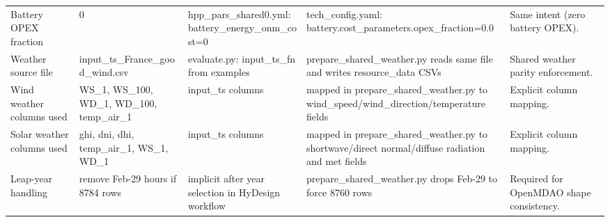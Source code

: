 \begin{center}
\begin{tabular}{L{0.16\textwidth} L{0.14\textwidth} L{0.22\textwidth} L{0.22\textwidth} L{0.20\textwidth}}
Battery OPEX fraction & 0 & hpp\_pars\_shared0.yml: battery\_energy\_onm\_cost=0 & tech\_config.yaml: battery.cost\_parameters.opex\_fraction=0.0 & Same intent (zero battery OPEX). \\
Weather source file & input\_ts\_France\_good\_wind.csv & evaluate.py: input\_ts\_fn from examples & prepare\_shared\_weather.py reads same file and writes resource\_data CSVs & Shared weather parity enforcement. \\
Wind weather columns used & WS\_1, WS\_100, WD\_1, WD\_100, temp\_air\_1 & input\_ts columns & mapped in prepare\_shared\_weather.py to wind\_speed/wind\_direction/temperature fields & Explicit column mapping. \\
Solar weather columns used & ghi, dni, dhi, temp\_air\_1, WS\_1, WD\_1 & input\_ts columns & mapped in prepare\_shared\_weather.py to shortwave/direct normal/diffuse radiation and met fields & Explicit column mapping. \\
Leap-year handling & remove Feb-29 hours if 8784 rows & implicit after year selection in HyDesign workflow & prepare\_shared\_weather.py drops Feb-29 to force 8760 rows & Required for OpenMDAO shape consistency. \\

\hline
\end{tabular}
\end{center}

\newpage

